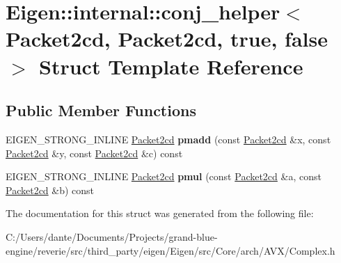 \hypertarget{struct_eigen_1_1internal_1_1conj__helper_3_01_packet2cd_00_01_packet2cd_00_01true_00_01false_01_4}{}\section{Eigen\+::internal\+::conj\+\_\+helper$<$ Packet2cd, Packet2cd, true, false $>$ Struct Template Reference}
\label{struct_eigen_1_1internal_1_1conj__helper_3_01_packet2cd_00_01_packet2cd_00_01true_00_01false_01_4}
\subsection*{Public Member Functions}
\begin{DoxyCompactItemize}
\item 
\mbox{\label{struct_eigen_1_1internal_1_1conj__helper_3_01_packet2cd_00_01_packet2cd_00_01true_00_01false_01_4_a166a5efc61cfff2f3635af5fbf37db0e}} 
E\+I\+G\+E\+N\+\_\+\+S\+T\+R\+O\+N\+G\+\_\+\+I\+N\+L\+I\+NE \mbox{\hyperlink{struct_eigen_1_1internal_1_1_packet2cd}{Packet2cd}} {\bfseries pmadd} (const \mbox{\hyperlink{struct_eigen_1_1internal_1_1_packet2cd}{Packet2cd}} \&x, const \mbox{\hyperlink{struct_eigen_1_1internal_1_1_packet2cd}{Packet2cd}} \&y, const \mbox{\hyperlink{struct_eigen_1_1internal_1_1_packet2cd}{Packet2cd}} \&c) const
\item 
\mbox{\label{struct_eigen_1_1internal_1_1conj__helper_3_01_packet2cd_00_01_packet2cd_00_01true_00_01false_01_4_ae350a7a68057b0ecabe9cbb3cba29737}} 
E\+I\+G\+E\+N\+\_\+\+S\+T\+R\+O\+N\+G\+\_\+\+I\+N\+L\+I\+NE \mbox{\hyperlink{struct_eigen_1_1internal_1_1_packet2cd}{Packet2cd}} {\bfseries pmul} (const \mbox{\hyperlink{struct_eigen_1_1internal_1_1_packet2cd}{Packet2cd}} \&a, const \mbox{\hyperlink{struct_eigen_1_1internal_1_1_packet2cd}{Packet2cd}} \&b) const
\end{DoxyCompactItemize}


The documentation for this struct was generated from the following file\+:\begin{DoxyCompactItemize}
\item 
C\+:/\+Users/dante/\+Documents/\+Projects/grand-\/blue-\/engine/reverie/src/third\+\_\+party/eigen/\+Eigen/src/\+Core/arch/\+A\+V\+X/Complex.\+h\end{DoxyCompactItemize}
